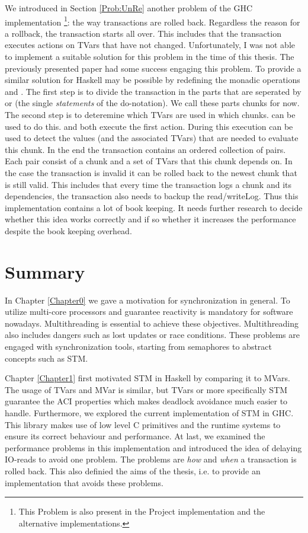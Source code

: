 We introduced in Section \ref{Prob:UnRe} another problem of the GHC implementation \footnote{This 
Problem is also present in the Project implementation and the alternative implementations.}: the way 
transactions are rolled back. Regardless the reason for a rollback, the transaction starts all
over. This includes that the transaction executes actions on TVars that have not changed. Unfortunately,
I was not able to implement a suitable solution for this problem in the time of this thesis. The previously
presented paper \parencite{checkpoint} had some success engaging this problem. To provide a similar 
solution for Haskell may be possible by redefining the monadic operations \code{>>} and \code{>>=}. 
The first step is to divide the transaction in the parts that are seperated by \code{>>} or \code{>>=} 
(the single \textit{statements} of the do-notation). We call these parts chunks for now. The second step 
is to deteremine which TVars are used in which chunks.  can be used to do this. 
\code{>>} and \code{>>=} both execute the first action. During this execution  can
be used to detect the values (and the associated TVars) that are needed to evaluate this chunk. In the
end the transaction contains an ordered collection of pairs. Each pair consist of a chunk and a set of
TVars that this chunk depends on. In the case the transaction is invalid it can be rolled back to the 
newest chunk that is still valid. This includes that every time the transaction logs a chunk and its 
dependencies, the transaction also needs to backup the read/writeLog. Thus this implementation contains
a lot of book keeping. It needs further research to decide whether this idea works correctly and if so
whether it increases the performance despite the book keeping overhead.

\section{Summary}
In Chapter \ref{Chapter0} we gave a motivation for synchronization in general. To utilize multi-core
processors and guarantee reactivity is mandatory for software nowadays. Multithreading is essential 
to achieve these objectives. Multithreading also includes dangers such as lost updates or race conditions. 
These problems are engaged with synchronization tools, starting from semaphores to abstract concepts
such as STM.

Chapter \ref{Chapter1} first motivated STM in Haskell by comparing it to MVars. The usage of TVars 
and MVar is similar, but TVars or more specifically STM guarantee the ACI properties which makes
deadlock avoidance much easier to handle. Furthermore, we explored the current implementation of STM
in GHC. This library makes use of low level C primitives and the runtime systems to ensure its 
correct behaviour and performance. At last, we examined the performance problems in this implementation
and introduced the idea of delaying IO-reads to avoid one problem. The problems are \textit{how} and 
\textit{when} a transaction is rolled back. This also definied the aims of the thesis, i.e. 
to provide an implementation that avoids these problems. 


